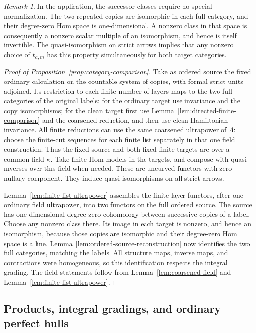 \documentclass[11pt]{article}
\numberwithin{equation}{section}
\theoremstyle{definition}
\theoremstyle{remark}
\newtheorem{remark}[theorem]{Remark}
\begin{document}
\begin{remark}
In the application, the successor classes require no special
normalization.  The two repeated copies are isomorphic in each full
category, and their degree-zero Hom space is one-dimensional.  A
nonzero class in that space is consequently a nonzero scalar multiple
of an isomorphism, and hence is itself invertible.  The quasi-isomorphism
on strict arrows implies that any nonzero choice of $t_{\alpha,m}$ has
this property simultaneously for both target categories.
\end{remark}

\begin{proof}[Proof of Proposition~\ref{prop:category-comparison}]
Take as ordered source the fixed ordinary calculation on the countable
system of copies, with formal strict units adjoined.  Its restriction
to each finite number of layers maps to the two full categories of
the original labels: for the ordinary target use invariance and the
copy isomorphisms; for the clean target first use
Lemma~\ref{lem:directed-finite-comparison} and the coarsened reduction,
and then use clean Hamiltonian invariance.  All finite reductions
can use the same coarsened ultrapower of $\Lambda$: choose the
finite-cut sequences for each finite list separately in that one
field construction.  Thus the fixed source and both fixed finite
targets are over a common field $\kappa$.  Take finite Hom models
in the targets, and compose with quasi-inverses over this field
when needed.  These are uncurved functors with zero nullary
component.  They induce quasi-isomorphisms on all strict arrows.

Lemma~\ref{lem:finite-list-ultrapower} assembles the finite-layer
functors, after one ordinary field ultrapower, into two functors
on the full ordered source.  The source has one-dimensional
degree-zero cohomology between successive copies of a label.
Choose any nonzero class there.  Its image in each target is
nonzero, and hence an isomorphism, because those copies are
isomorphic and their degree-zero Hom space is a line.
Lemma~\ref{lem:ordered-source-reconstruction} now identifies the
two full categories, matching the labels.  All structure maps,
inverse maps, and contractions were homogeneous, so this
identification respects the integral grading.  The field
statements follow from Lemma~\ref{lem:coarsened-field} and
Lemma~\ref{lem:finite-list-ultrapower}.
\end{proof}

\subsection{Products, integral gradings, and ordinary perfect hulls}
\end{document}
